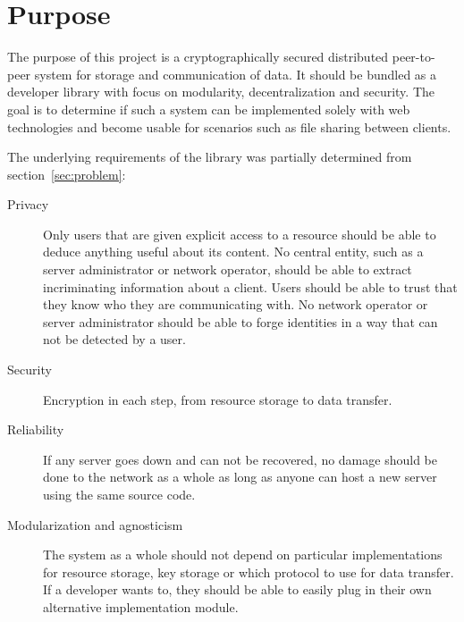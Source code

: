 \section{Purpose}\label{sec:purpose}

The purpose of this project is a cryptographically secured distributed peer-to-peer system for storage and communication of data. It should be bundled as a developer library with focus on modularity, decentralization and security. The goal is to determine if such a system can be implemented solely with web technologies and become usable for scenarios such as file sharing between clients.

The underlying requirements of the library was partially determined from section~\ref{sec:problem}:

\begin{description}
  \item[Privacy] Only users that are given explicit access to a resource should be able to deduce anything useful about its content. No central entity, such as a server administrator or network operator, should be able to extract incriminating information about a client. Users should be able to trust that they know who they are communicating with. No network operator or server administrator should be able to forge identities in a way that can not be detected by a user.

\item[Security] Encryption in each step, from resource storage to data transfer.

\item[Reliability] If any server goes down and can not be recovered, no damage should be done to the network as a whole as long as anyone can host a new server using the same source code.

\item[Modularization and agnosticism] The system as a whole should not depend on particular implementations for resource storage, key storage or which protocol to use for data transfer. If a developer wants to, they should be able to easily plug in their own alternative implementation module.

\end{description}
